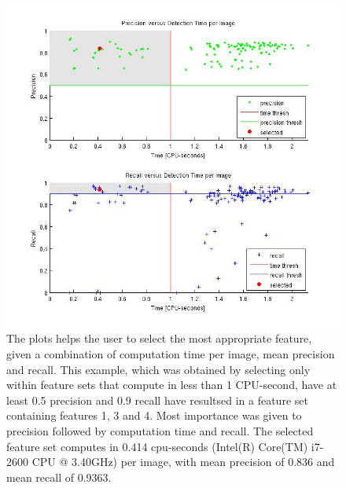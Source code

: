 	\begin{figure}
		  \includegraphics[width=\textwidth]{images/best_features}
		\caption{The plots helps the user to select the most appropriate feature, given a combination of computation time per image, mean precision and recall. This example, which was obtained by selecting only within feature sets that compute in less than 1 CPU-second, have at least 0.5 precision and 0.9 recall have resultsed in a feature set containing features 1, 3 and 4. Most importance was given to precision followed by computation time and recall. The selected feature set computes in 0.414 cpu-seconds (Intel(R) Core(TM) i7-2600 CPU @ 3.40GHz) per image, with mean precision of 0.836 and mean recall of 0.9363.}
	    \label{fig:bestFeatureSelector}
	\end{figure}
	